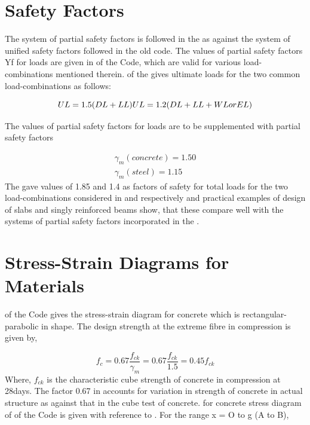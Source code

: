 \section{Safety Factors}

The system of partial safety factors is followed in the
 as against the system of uniﬁed safety factors
followed in the old code. The values of partial safety factors Yf for
loads are given in  of the Code, which are valid for various
load-combinations mentioned therein.  of the 
gives ultimate loads for the two common load-combinations as
follows:

\begin{equation}
UL = 1.5 (DL + LL)\\
UL = 1.2 (DL + LL + WL or EL)
\end{equation}

The values of partial safety factors for loads are to be supplemented
with partial safety factors

\begin{align}
\gamma_m (concrete) = 1.50\\
\gamma_m (steel) = 1.15 
\end{align}
The  gave values of 1.85 and 1.4 as factors of
safety for total loads for the two load-combinations considered in
 and  respectively and practical examples of design of
slabs and singly reinforced beams show, that these compare well with the
systems of partial safety factors incorporated in the
.

\section{Stress-Strain Diagrams for Materials}

 of the Code gives the stress-strain diagram for concrete which
is rectangular-parabolic in shape. The design strength at the extreme
ﬁbre in compression is given by,

\begin{equation}
f_c = 0.67\frac{f_{ck}}{\gamma_m} = 0.67\frac{f_{ck}}{1.5}=0.45 f_{ck}
\end{equation}
Where, $f_{ck}$ is the characteristic cube strength of concrete in
compression at 28days. The factor 0.67 in  accounts for
variation in strength of concrete in actual structure as against
that in the cube test of concrete. \eqn for concrete stress diagram
of  of the Code is given with reference to . For the
range x = O to g (A to B),

